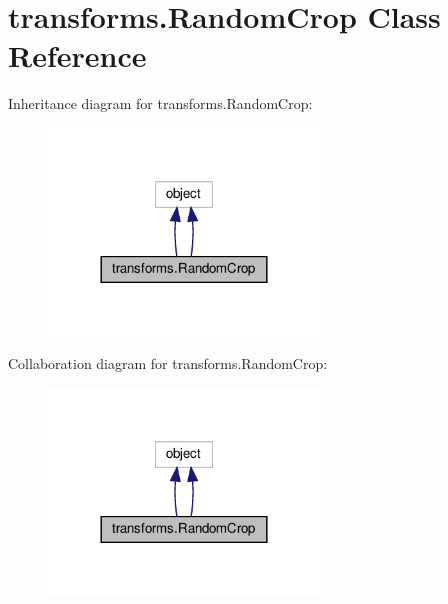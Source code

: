 \hypertarget{classtransforms_1_1RandomCrop}{}\section{transforms.\+Random\+Crop Class Reference}
\label{classtransforms_1_1RandomCrop}


Inheritance diagram for transforms.\+Random\+Crop\+:
\nopagebreak
\begin{figure}[H]
\begin{center}
\leavevmode
\includegraphics[width=204pt]{classtransforms_1_1RandomCrop__inherit__graph}
\end{center}
\end{figure}


Collaboration diagram for transforms.\+Random\+Crop\+:
\nopagebreak
\begin{figure}[H]
\begin{center}
\leavevmode
\includegraphics[width=204pt]{classtransforms_1_1RandomCrop__coll__graph}
\end{center}
\end{figure}
